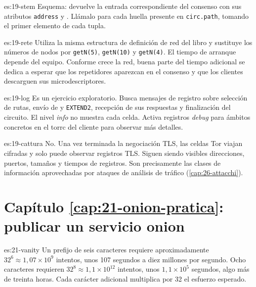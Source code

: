 \begin{soluzione}{es:19-stem}
Esquema:  devuelve la entrada correspondiente del consenso con sus atributos \texttt{address} y . Llámalo para cada huella presente en \texttt{circ.path}, tomando el primer elemento de cada tupla.
\end{soluzione}

\begin{soluzione}{es:19-rete}
Utiliza la misma estructura de definición de red del libro y sustituye los números de nodos por \texttt{getN(5)}, \texttt{getN(10)} y \texttt{getN(4)}. El tiempo de arranque depende del equipo. Conforme crece la red, buena parte del tiempo adicional se dedica a esperar que los repetidores aparezcan en el consenso y que los clientes descarguen sus microdescriptores.
\end{soluzione}

\begin{soluzione}{es:19-log}
Es un ejercicio exploratorio. Busca mensajes de registro sobre selección de rutas, envío de  y \texttt{EXTEND2}, recepción de sus respuestas y finalización del circuito. El nivel \emph{info} no muestra cada celda. Activa registros \emph{debug} para ámbitos concretos en el torrc del cliente para observar más detalles.
\end{soluzione}

\begin{soluzione}{es:19-cattura}
No. Una vez terminada la negociación TLS, las celdas Tor viajan cifradas y  solo puede observar registros TLS. Siguen siendo visibles direcciones, puertos, tamaños y tiempos de registros. Son precisamente las clases de información aprovechadas por ataques de análisis de tráfico (\cref{cap:26-attacchi}).
\end{soluzione}

\section*{Capítulo \ref{cap:21-onion-pratica}: publicar un servicio onion}

\begin{soluzione}{es:21-vanity}
Un prefijo de seis caracteres requiere aproximadamente $32^6\approx1{,}07\times10^9$ intentos, unos 107 segundos a diez millones por segundo. Ocho caracteres requieren $32^8\approx1{,}1\times10^{12}$ intentos, unos $1{,}1\times10^5$ segundos, algo más de treinta horas. Cada carácter adicional multiplica por 32 el esfuerzo esperado.
\end{soluzione}

